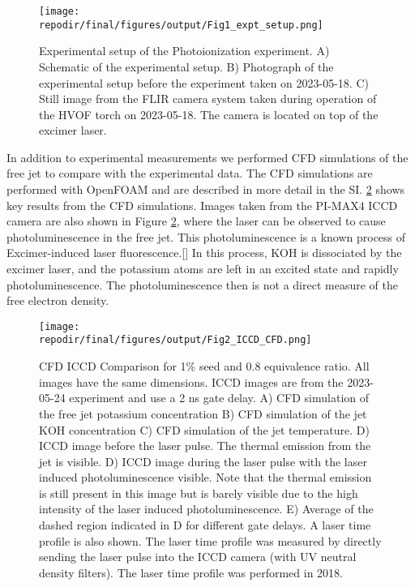\begin{figure}[h]
    \texttt{[image: \\repodir/final/figures/output/Fig1\_expt\_setup.png]} 
    \caption{Experimental setup of the Photoionization experiment. A) Schematic of the experimental setup. B) Photograph of the experimental setup before the experiment taken on 2023-05-18. C) Still image from the FLIR camera system taken during operation of the HVOF torch on 2023-05-18. The camera is located on top of the excimer laser. }
    \label{fig:expt_setup}
\end{figure}

In addition to experimental measurements we performed CFD simulations of the free jet to compare with the experimental data. The CFD simulations are performed with OpenFOAM and are described in more detail in the SI. \ref{fig:ICCD_CFD} shows key results from the CFD simulations. Images taken from the PI-MAX4 ICCD camera are also shown in Figure \ref{fig:ICCD_CFD}, where the laser can be observed to cause photoluminescence in the free jet. This photoluminescence is a known process of Excimer-induced laser fluorescence.[] In this process, KOH is dissociated by the excimer laser, and the potassium atoms are left in an excited state and rapidly photoluminescence. The photoluminescence then is not a direct measure of the free electron density. 

\begin{figure}[h]
    \texttt{[image: \\repodir/final/figures/output/Fig2\_ICCD\_CFD.png]} 
    \caption{CFD ICCD Comparison for 1\% seed and 0.8 equivalence ratio. All images have the same dimensions. ICCD images are from the 2023-05-24 experiment and use a 2 ns gate delay. A) CFD simulation of the free jet potassium concentration B) CFD simulation of the jet KOH concentration C) CFD simulation of the jet temperature. D) ICCD image before the laser pulse. The thermal emission from the jet is visible. D) ICCD image during the laser pulse with the laser induced photoluminescence visible. Note that the thermal emission is still present in this image but is barely visible due to the high intensity of the laser induced photoluminescence. E) Average of the dashed region indicated in D for different gate delays. A laser time profile is also shown. The laser time profile was measured by directly sending the laser pulse into the ICCD camera (with UV neutral density filters). The laser time profile was performed in 2018. }
    \label{fig:ICCD_CFD}
\end{figure}


